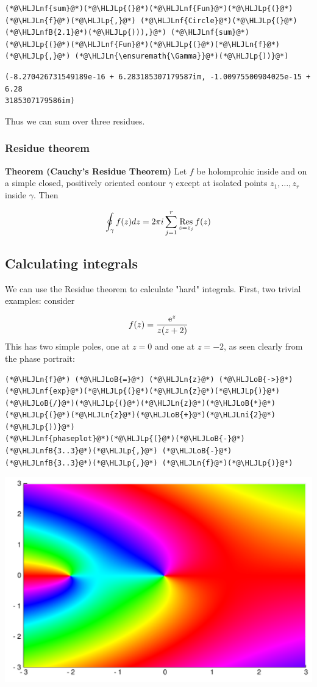 \documentclass[12pt,a4paper]{article}
\newcommand{\HLJLn}[1]{#1}
\newcommand{\HLJLnf}[1]{\textcolor[RGB]{66,102,213}{#1}}
\newcommand{\HLJLnfB}[1]{\textcolor[RGB]{59,151,46}{#1}}
\newcommand{\HLJLni}[1]{\textcolor[RGB]{59,151,46}{#1}}
\newcommand{\HLJLoB}[1]{\textcolor[RGB]{102,102,102}{\textbf{#1}}}
\newcommand{\HLJLp}[1]{#1}
\def\E{ {\rm e} }
\begin{document}
\begin{lstlisting}
(*@\HLJLnf{sum}@*)(*@\HLJLp{(}@*)(*@\HLJLnf{Fun}@*)(*@\HLJLp{(}@*)(*@\HLJLn{f}@*)(*@\HLJLp{,}@*) (*@\HLJLnf{Circle}@*)(*@\HLJLp{(}@*)(*@\HLJLnfB{2.1}@*)(*@\HLJLp{))),}@*) (*@\HLJLnf{sum}@*)(*@\HLJLp{(}@*)(*@\HLJLnf{Fun}@*)(*@\HLJLp{(}@*)(*@\HLJLn{f}@*)(*@\HLJLp{,}@*) (*@\HLJLn{\ensuremath{\Gamma}}@*)(*@\HLJLp{))}@*)
\end{lstlisting}

\begin{lstlisting}
(-8.270426731549189e-16 + 6.283185307179587im, -1.00975500904025e-15 + 6.28
3185307179586im)
\end{lstlisting}


Thus we can sum over three residues.

\subsubsection{Residue theorem}
\textbf{Theorem (Cauchy's Residue Theorem)} Let $f$ be holomprohic inside and on a simple closed, positively oriented contour $\gamma$ except at isolated points $z_1, \ldots, z_r$ inside $\gamma$. Then

\[
\oint_\gamma f(z) dz = 2 \pi i \sum_{j=1}^r {\underset{z = z_j}{\rm Res}}\, f(z)
\]
\subsection{Calculating integrals}
We can use the Residue theorem to calculate "hard" integrals. First, two trivial examples: consider

\[
f(z) = {\E^z \over z (z+2)}
\]
This has two simple poles, one at $z=0$ and one at $z = -2$, as seen clearly from the  phase portrait:


\begin{lstlisting}
(*@\HLJLn{f}@*) (*@\HLJLoB{=}@*) (*@\HLJLn{z}@*) (*@\HLJLoB{->}@*) (*@\HLJLnf{exp}@*)(*@\HLJLp{(}@*)(*@\HLJLn{z}@*)(*@\HLJLp{)}@*)(*@\HLJLoB{/}@*)(*@\HLJLp{(}@*)(*@\HLJLn{z}@*)(*@\HLJLoB{*}@*)(*@\HLJLp{(}@*)(*@\HLJLn{z}@*)(*@\HLJLoB{+}@*)(*@\HLJLni{2}@*)(*@\HLJLp{))}@*)
(*@\HLJLnf{phaseplot}@*)(*@\HLJLp{(}@*)(*@\HLJLoB{-}@*)(*@\HLJLnfB{3..3}@*)(*@\HLJLp{,}@*) (*@\HLJLoB{-}@*)(*@\HLJLnfB{3..3}@*)(*@\HLJLp{,}@*) (*@\HLJLn{f}@*)(*@\HLJLp{)}@*)
\end{lstlisting}

\includegraphics[width=\linewidth]{figures/Lecture3_3_1.pdf}
\end{document}
